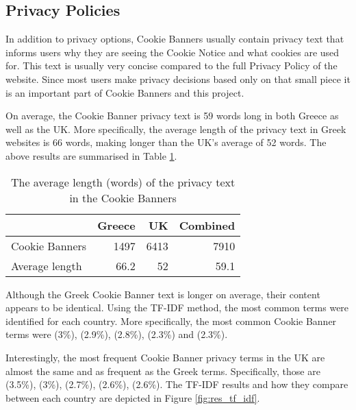 \documentclass[../main.tex]{subfiles}
\begin{document}
\subsection{Privacy Policies}
In addition to privacy options, Cookie Banners usually contain privacy text that informs users why they are seeing the Cookie Notice and what cookies are used for. This text is usually very concise compared to the full Privacy Policy of the website. Since most users make privacy decisions based only on that small piece it is an important part of Cookie Banners and this project.

On average, the Cookie Banner privacy text is 59 words long in both Greece as well as the UK. More specifically, the average length of the privacy text in Greek websites is 66 words, making longer than the UK’s average of 52 words. The above results are summarised in Table \ref{tab:privacy_txt_len}.

\begin{table}[ht]
    \centering
    \begin{tabular}{@{}lrrr@{}}
        \toprule
                          & Greece & UK    & Combined \\ \midrule
        Cookie Banners    & 1497   & 6413  & 7910  \\
        Average length    & 66.2   & 52    & 59.1  \\ \bottomrule
    \end{tabular}
    \caption{The average length (words) of the privacy text in the Cookie Banners}
    \label{tab:privacy_txt_len}
\end{table}

Although the Greek Cookie Banner text is longer on average, their content appears to be identical. Using the TF-IDF method, the most common terms were identified for each country. More specifically, the most common Cookie Banner terms were  (3\%),  (2.9\%),  (2.8\%),  (2.3\%) and  (2.3\%). 

Interestingly, the most frequent Cookie Banner privacy terms in the UK are almost the same and as frequent as the Greek terms. Specifically, those are  (3.5\%),  (3\%),  (2.7\%),  (2.6\%),  (2.6\%). The TF-IDF results and how they compare between each country are depicted in Figure \ref{fig:res_tf_idf}.

\grTFIDF
\end{document}
